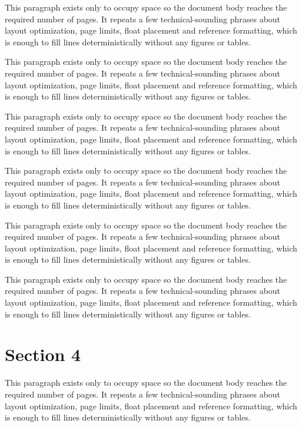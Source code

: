 \documentclass[10pt,letterpaper]{article}
\begin{document}
This paragraph exists only to occupy space so the document body reaches the required number of pages. It repeats a few technical-sounding phrases about layout optimization, page limits, float placement and reference formatting, which is enough to fill lines deterministically without any figures or tables.

This paragraph exists only to occupy space so the document body reaches the required number of pages. It repeats a few technical-sounding phrases about layout optimization, page limits, float placement and reference formatting, which is enough to fill lines deterministically without any figures or tables.

This paragraph exists only to occupy space so the document body reaches the required number of pages. It repeats a few technical-sounding phrases about layout optimization, page limits, float placement and reference formatting, which is enough to fill lines deterministically without any figures or tables.

This paragraph exists only to occupy space so the document body reaches the required number of pages. It repeats a few technical-sounding phrases about layout optimization, page limits, float placement and reference formatting, which is enough to fill lines deterministically without any figures or tables.

This paragraph exists only to occupy space so the document body reaches the required number of pages. It repeats a few technical-sounding phrases about layout optimization, page limits, float placement and reference formatting, which is enough to fill lines deterministically without any figures or tables.

This paragraph exists only to occupy space so the document body reaches the required number of pages. It repeats a few technical-sounding phrases about layout optimization, page limits, float placement and reference formatting, which is enough to fill lines deterministically without any figures or tables.

\section{Section 4}
This paragraph exists only to occupy space so the document body reaches the required number of pages. It repeats a few technical-sounding phrases about layout optimization, page limits, float placement and reference formatting, which is enough to fill lines deterministically without any figures or tables.
\end{document}
